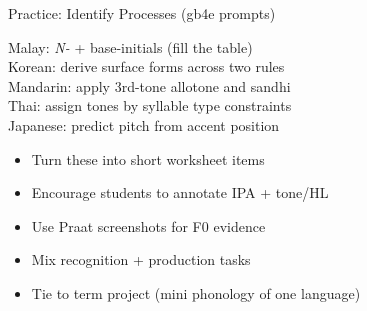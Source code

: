 \documentclass{beamer}
\begin{document}
\begin{frame}{Practice: Identify Processes (gb4e prompts)}
\begin{exe}
\ex Malay: \textit{N-} + base-initials (fill the table) \\
\ex Korean: derive surface forms across two rules \\
\ex Mandarin: apply 3rd-tone allotone and sandhi \\
\ex Thai: assign tones by syllable type constraints \\
\ex Japanese: predict pitch from accent position
\end{exe}
\begin{itemize}
\item Turn these into short worksheet items
\item Encourage students to annotate IPA + tone/HL
\item Use Praat screenshots for F0 evidence
\item Mix recognition + production tasks
\item Tie to term project (mini phonology of one language)
\end{itemize}
\end{frame}

\end{document}
